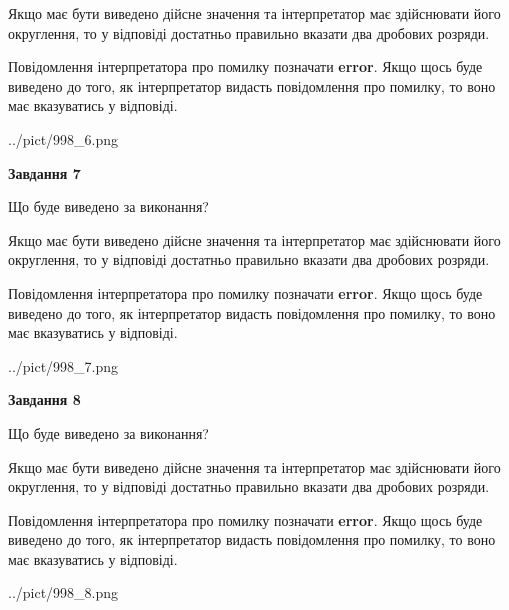 \documentclass[12pt, ukrainian]{article}
\begin{document}
{\begin {Large}
Якщо має бути виведено дійсне значення та інтерпретатор має здійснювати його округлення, 
то у відповіді достатньо правильно вказати два дробових розряди.

Повідомлення інтерпретатора про помилку позначати \textbf{error}.
Якщо щось буде виведено до того, як інтерпретатор видасть повідомлення про помилку, 
то воно має вказуватись у відповіді. \par

\begin{center}
	{../pict/998_6.png}
\end{center}
\newpage

{\begin {center}\textbf{Завдання 7}\end {center}}\par
Що буде виведено за виконання? \par

Якщо має бути виведено дійсне значення та інтерпретатор має здійснювати його округлення, 
то у відповіді достатньо правильно вказати два дробових розряди.

Повідомлення інтерпретатора про помилку позначати \textbf{error}.
Якщо щось буде виведено до того, як інтерпретатор видасть повідомлення про помилку, 
то воно має вказуватись у відповіді. \par

\begin{center}
	{../pict/998_7.png}
\end{center}
\newpage

{\begin {center}\textbf{Завдання 8}\end {center}}\par
Що буде виведено за виконання? \par

Якщо має бути виведено дійсне значення та інтерпретатор має здійснювати його округлення, 
то у відповіді достатньо правильно вказати два дробових розряди.

Повідомлення інтерпретатора про помилку позначати \textbf{error}.
Якщо щось буде виведено до того, як інтерпретатор видасть повідомлення про помилку, 
то воно має вказуватись у відповіді. \par

\begin{center}
	{../pict/998_8.png}
\end{center}
\newpage


\end{Large}}
\end{document}
